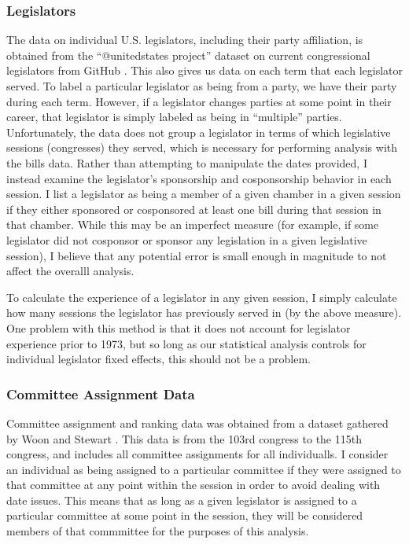 \documentclass{article}
\begin{document}
\subsubsection{Legislators}
The data on individual U.S. legislators, including their party affiliation, is obtained from the ``@unitedstates project'' dataset on current congressional legislators from GitHub \cite{congress-legislators}. This also gives us data on each term that each legislator served. To label a particular legislator as being from a party, we have their party during each term. However, if a legislator changes parties at some point in their career, that legislator is simply labeled as being in ``multiple'' parties. Unfortunately, the data does not group a legislator in terms of which legislative sessions (congresses) they served, which is necessary for performing analysis with the bills data. Rather than attempting to manipulate the dates provided, I instead examine the legislator's sponsorship and cosponsorship behavior in each session. I list a legislator as being a member of a given chamber in a given session if they either sponsored or cosponsored at least one bill during that session in that chamber. While this may be an imperfect measure (for example, if some legislator did not cosponsor or sponsor any legislation in a given legislative session), I believe that any potential error is small enough in magnitude to not affect the overalll analysis.

To calculate the experience of a legislator in any given session, I simply calculate how many sessions the legislator has previously served in (by the above measure). One problem with this method is that it does not account for legislator experience prior to 1973, but so long as our statistical analysis controls for individual legislator fixed effects, this should not be a problem. 

\subsubsection{Committee Assignment Data}
Committee assignment and ranking data was obtained from a dataset gathered by Woon and Stewart \cite{stewart-committee-assignments}. This data is from the 103rd congress to the 115th congress, and includes all committee assignments for all individualls. I consider an individual as being assigned to a particular committee if they were assigned to that committee at any point within the session in order to avoid dealing with date issues. This means that as long as a given legislator is assigned to a particular committee at some point in the session, they will be considered members of that commmittee for the purposes of this analysis. 
\end{document}
